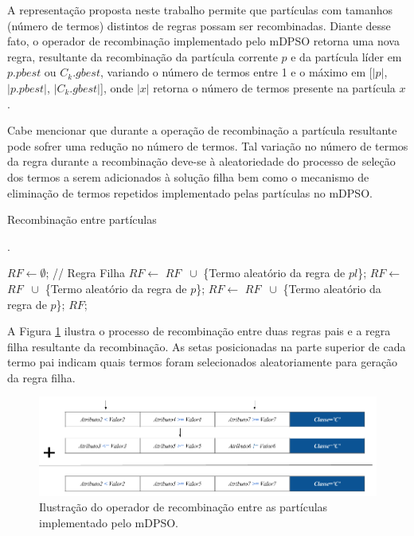 \documentclass[
	12pt,				%
	openany,			%
	oneside,	
	a4paper,			%
	brazil,				%
	]{unimontes-ppgmsc-abntex2}
\begin{document}
A representação proposta neste trabalho permite que partículas com tamanhos (número de termos) distintos de regras possam ser recombinadas. Diante desse fato, o operador de recombinação implementado pelo mDPSO retorna uma nova regra, resultante da recombinação da partícula corrente $p$ e da partícula líder em $p.pbest$ ou $C_k.gbest$, variando o número de termos entre 1 e o máximo em [$|p|$, $|p.pbest|$, $|C_k.gbest|$], onde $|x|$ retorna o número de termos presente na partícula $x$. 

Cabe mencionar que durante a operação de recombinação a partícula resultante pode sofrer uma redução no número de termos. Tal variação no número de termos da regra durante a recombinação deve-se à aleatoriedade do processo de seleção dos termos a serem adicionados à solução filha bem como o mecanismo de eliminação de termos repetidos implementado pelas partículas no mDPSO.

\begin{algorithm}[ht]
\caption{Recombinação entre partículas}.
\label{alg:recomb}
\begin{algorithmic}[1]
\State $RF \leftarrow \emptyset$; // Regra Filha
		\State $RF \leftarrow$ $RF$ $\ \cup$ \{Termo aleatório da regra de $pl$\};
	\Else
		\State $RF \leftarrow$ $RF$ $\ \cup$ \{Termo aleatório da regra de $p$\};
	\EndIf
\EndFor
{}
	\State $RF \leftarrow$ $RF$ $\ \cup$ \{Termo aleatório da regra de $p$\};
\EndFor
\State \Return $RF$;
\end{algorithmic}
\end{algorithm}

A Figura \ref{fig:recomb} ilustra o processo de recombinação entre duas regras pais e a regra filha resultante da recombinação. As setas posicionadas na parte superior de cada termo pai  indicam quais termos foram selecionados aleatoriamente para geração da regra filha.

\begin{figure}[ht]
\centering
\includegraphics[scale=.5]{img/recombinacao}
\caption{Ilustração do operador de recombinação entre as partículas implementado pelo mDPSO.}
\label{fig:recomb}
\end{figure}
\end{document}
